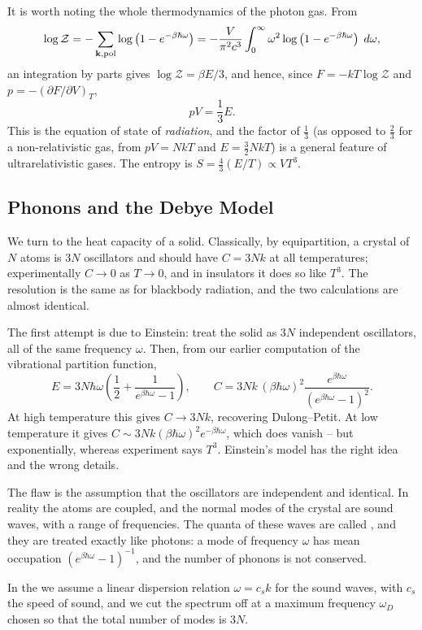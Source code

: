 \documentclass[a4paper]{scrartcl}
\begin{document}
It is worth noting the whole thermodynamics of the photon gas. From
$$
\log \mathcal Z = -\sum_{\mathbf{k}, \text{pol}} \log\left(1 - e^{-\beta\hbar\omega}\right) = -\frac{V}{\pi^2c^3}\int_0^\infty \omega^2 \log\left(1-e^{-\beta\hbar\omega}\right)\; d\omega,
$$
an integration by parts gives $\log\mathcal Z = \beta E/3$, and hence, since $F = -kT\log \mathcal Z$ and $p = -(\partial F/\partial V)_T$,
$$
pV = \frac 13 E.
$$
This is the equation of state of \emph{radiation}, and the factor of $\tfrac 13$ (as opposed to $\tfrac 23$ for a non-relativistic gas, from $pV = NkT$ and $E = \tfrac 32 NkT$) is a general feature of ultrarelativistic gases. The entropy is $S = \tfrac 43 (E/T) \propto VT^3$.

\subsection{Phonons and the Debye Model}\label{sec:debye}

We turn to the heat capacity of a solid. Classically, by equipartition, a crystal of $N$ atoms is $3N$ oscillators and should have $C = 3Nk$ at all temperatures; experimentally $C \to 0$ as $T \to 0$, and in insulators it does so like $T^3$. The resolution is the same as for blackbody radiation, and the two calculations are almost identical.

The first attempt is due to Einstein: treat the solid as $3N$ independent oscillators, all of the same frequency $\omega$. Then, from our earlier computation of the vibrational partition function,
$$
E = 3N\hbar\omega\left(\frac 12 + \frac{1}{e^{\beta\hbar\omega}-1}\right), \qquad C = 3Nk\,(\beta\hbar\omega)^2 \frac{e^{\beta\hbar\omega}}{(e^{\beta\hbar\omega}-1)^2}.
$$
At high temperature this gives $C \to 3Nk$, recovering Dulong--Petit. At low temperature it gives $C \sim 3Nk(\beta\hbar\omega)^2 e^{-\beta\hbar\omega}$, which does vanish -- but exponentially, whereas experiment says $T^3$. Einstein's model has the right idea and the wrong details.

The flaw is the assumption that the oscillators are independent and identical. In reality the atoms are coupled, and the normal modes of the crystal are sound waves, with a range of frequencies. The quanta of these waves are called , and they are treated exactly like photons: a mode of frequency $\omega$ has mean occupation $(e^{\beta\hbar\omega}-1)^{-1}$, and the number of phonons is not conserved.

\begin{definition}
	In the  we assume a linear dispersion relation $\omega = c_s k$ for the sound waves, with $c_s$ the speed of sound, and we cut the spectrum off at a maximum frequency $\omega_D$ chosen so that the total number of modes is $3N$.
\end{definition}
\end{document}
